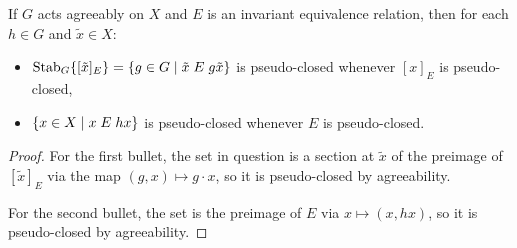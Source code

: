 	\begin{lem}
		\label{lem:psclsd}
		If $G$ acts agreeably on $X$ and $E$ is an invariant equivalence relation, then for each $h\in G$ and $\tilde x\in X$:
		\begin{itemize}
			\item
			$\operatorname{{Stab}}_G\{[\tilde x]_E\}=\{g\in G\mid \tilde x\mathrel{E} g\tilde x \}$ is pseudo-closed whenever $[x]_E$ is pseudo-closed,
			\item
			$\{x\in X\mid x\mathrel{E} hx \}$ is pseudo-closed whenever $E$ is pseudo-closed.
		\end{itemize}
	\end{lem}
	\begin{proof}
		For the first bullet, the set in question is a section at $\tilde x$ of the preimage of $[\tilde x]_E$ via the map $(g,x)\mapsto g\cdot x$, so it is pseudo-closed by agreeability.
		
		For the second bullet, the set is the preimage of $E$ via $x\mapsto (x,hx)$, so it is pseudo-closed by agreeability.
	\end{proof}
	
	
	

